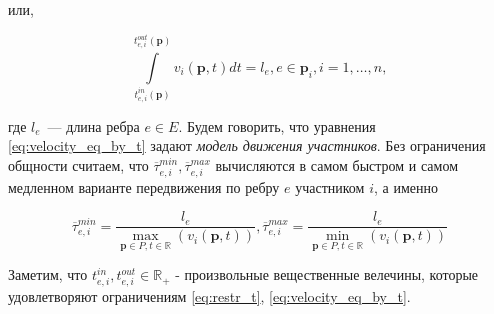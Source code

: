 \documentclass[12pt, a4paper]{article}
\begin{document}
или,

\begin{equation}
	\label{eq:velocity_eq_by_t}
	\int\limits_{t_{e, i}^{in}(\textbf{p})}^{t_{e, i}^{out}(\textbf{p})} v_i(\textbf{p}, t) dt = l_e, e \in \textbf{p}_i, i = 1, \dots, n,
\end{equation}

где $l_e$~--- длина ребра $e \in E$. Будем говорить, что уравнения \eqref{eq:velocity_eq_by_t} задают \textit{модель движения участников}. Без ограничения общности считаем, что $\overline{\tau}_{e, i}^{min}, \overline{\tau}_{e, i}^{max}$ вычисляются в самом быстром и самом медленном варианте передвижения по ребру $e$ участником $i$, а именно

\begin{equation}
	\label{eq:restr_add_concrete}
	\overline{\tau}_{e, i}^{min} = \frac{l_e}{\max\limits_{\textbf{p} \in P, t \in \mathbb{R}} \left(  v_i(\textbf{p}, t) \right)}, \overline{\tau}_{e, i}^{max} = \frac{l_e}{\min\limits_{\textbf{p} \in P, t \in \mathbb{R}} \left(  v_i(\textbf{p}, t) \right)}
\end{equation}

Заметим, что $t_{e, i}^{in}, t_{e, i}^{out} \in \mathbb{R}_+$ - произвольные вещественные велечины, которые удовлетворяют ограничениям \eqref{eq:restr_t}, \eqref{eq:velocity_eq_by_t}.
\end{document}
